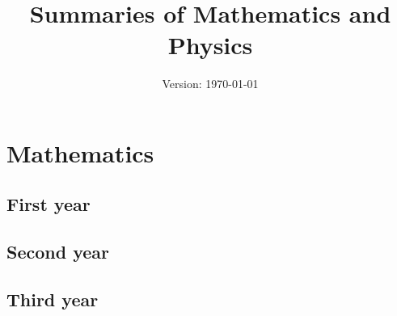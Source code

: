 \documentclass{report}
\title{Summaries of Mathematics and Physics}
\author{}
\date{Version: \today}
\begin{document}
\maketitle
\newpage
\tableofcontents
\newpage
\part{Mathematics}
\chapter{First year}
\newpage

\cleardoublepage


\cleardoublepage


\cleardoublepage
\chapter{Second year}
\newpage

\cleardoublepage


\cleardoublepage


\cleardoublepage


\cleardoublepage


\cleardoublepage


\cleardoublepage

\chapter{Third year}
\newpage

\cleardoublepage


\cleardoublepage


\cleardoublepage


\cleardoublepage
\end{document}
